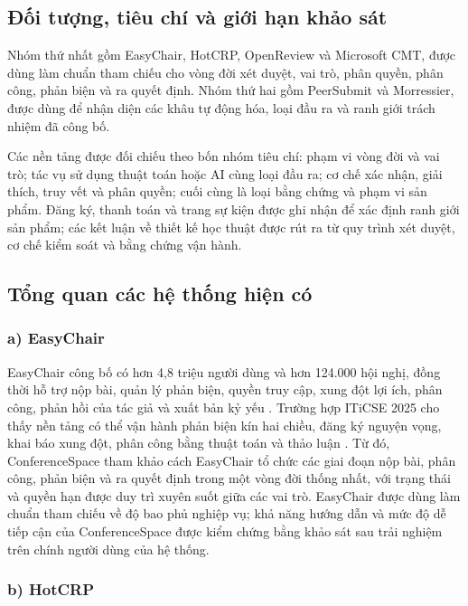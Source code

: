 \subsection{Đối tượng, tiêu chí và giới hạn khảo sát}

Nhóm thứ nhất gồm EasyChair, HotCRP, OpenReview và Microsoft CMT, được dùng làm chuẩn tham chiếu cho vòng đời xét duyệt, vai trò, phân quyền, phân công, phản biện và ra quyết định. Nhóm thứ hai gồm PeerSubmit và Morressier, được dùng để nhận diện các khâu tự động hóa, loại đầu ra và ranh giới trách nhiệm đã công bố.

Các nền tảng được đối chiếu theo bốn nhóm tiêu chí: phạm vi vòng đời và vai trò; tác vụ sử dụng thuật toán hoặc AI cùng loại đầu ra; cơ chế xác nhận, giải thích, truy vết và phân quyền; cuối cùng là loại bằng chứng và phạm vi sản phẩm. Đăng ký, thanh toán và trang sự kiện được ghi nhận để xác định ranh giới sản phẩm; các kết luận về thiết kế học thuật được rút ra từ quy trình xét duyệt, cơ chế kiểm soát và bằng chứng vận hành.

\subsection{Tổng quan các hệ thống hiện có}

\subsubsection{a) EasyChair}

EasyChair công bố có hơn 4,8 triệu người dùng và hơn 124.000 hội nghị, đồng thời hỗ trợ nộp bài, quản lý phản biện, quyền truy cập, xung đột lợi ích, phân công, phản hồi của tác giả và xuất bản kỷ yếu \cite{ch2ref1,ch2ref2}. Trường hợp ITiCSE 2025 cho thấy nền tảng có thể vận hành phản biện kín hai chiều, đăng ký nguyện vọng, khai báo xung đột, phân công bằng thuật toán và thảo luận \cite{ch2ref57}. Từ đó, ConferenceSpace tham khảo cách EasyChair tổ chức các giai đoạn nộp bài, phân công, phản biện và ra quyết định trong một vòng đời thống nhất, với trạng thái và quyền hạn được duy trì xuyên suốt giữa các vai trò. EasyChair được dùng làm chuẩn tham chiếu về độ bao phủ nghiệp vụ; khả năng hướng dẫn và mức độ dễ tiếp cận của ConferenceSpace được kiểm chứng bằng khảo sát sau trải nghiệm trên chính người dùng của hệ thống.

\subsubsection{b) HotCRP}


